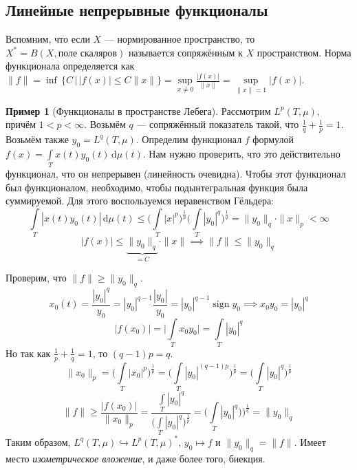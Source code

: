 \documentclass[11pt,openany,a4paper]{scrartcl}
\theoremstyle{plain}
\theoremstyle{definition}
\newtheorem{example}[theorem]{Пример}
\newcommand{\dif}{\, \mathrm d}
\DeclareMathOperator{\sign}{sign}
\begin{document}
\subsection{Линейные непрерывные функционалы}

Вспомним, что если $X$ — нормированное пространство, то
$X^\ast = B(X, \text{поле скаляров})$ называется сопряжённым к $X$ пространством.
Норма функционала определяется как $\|f\| = \inf\,\{C\,\big|\,|f(x)|
\leqslant C\|x\|\} =
\sup\limits_{x \neq 0}\frac{|f(x)|}{\|x\|} = \sup\limits_{\|x\|=1} |f(x)|$.

\begin{example}[Функционалы в пространстве Лебега]
        Рассмотрим $L^p(T, \mu)$, причём
        $1 < p < \infty$. Возьмём $q$ — сопряжённый показатель такой, что
        $\frac{1}{q} + \frac{1}{p} = 1$. Возьмём также $y_0 = L^q(T, \mu)$.
        Определим функционал $f$ формулой
        $f(x) = \int\limits_T x(t)y_0(t)\dif \mu(t)$. Нам нужно проверить, что
        это действительно функционал, что он непрерывен (линейность очевидна).
        Чтобы этот функционал был функционалом, необходимо, чтобы
        подынтегральная функция была суммируемой. Для этого воспользуемся
        неравенством Гёльдера:
        $$
        \int\limits_T |x(t)y_0(t)| \dif \mu(t) \leqslant
        \bigg(\int\limits_T |x|^p\bigg)^\frac{1}{p}
        \bigg(\int\limits_T |y_0|^q\bigg)^\frac{1}{q} = \|y_0\|_q\cdot \|x\|_p <
        \infty
        $$
        $$
        |f(x)| \leqslant \underbrace{\|y_0\|_q}_{=C} \cdot \|x\|
        \implies \|f\| \leqslant \|y_0\|_q
        $$
        
        Проверим, что $\|f\| \geqslant \|y_0\|_q$.
        $$
        x_0(t) = \frac{|y_0|^q}{y_0} = |y_0|^{q-1} \frac{|y_0|}{y_0} =
        |y_0|^{q-1}\sign y_0
        \implies x_0y_0 = |y_0|^q
        $$
        $$
        |f(x_0)| = \bigg|\int\limits_T x_0y_0\bigg| = \int\limits_T|y_0|^q
        $$
        Но так как $\frac{1}{p} + \frac{1}{q} = 1$, то $(q-1)p = q$.
        $$
        \|x_0\|_p = \bigg(\int\limits_T |x_0|^p\bigg)^\frac{1}{p} =
        \bigg(\int\limits_T |y_0|^{(q-1)p}\bigg)^\frac{1}{p} =
        \bigg(\int\limits_T |y_0|^q\bigg)^\frac{1}{p}
        $$
        $$
        \|f\|\geqslant \frac{|f(x_0)|}{\|x_0\|_p} =
        \frac{\int\limits_T |y_0|^q}{\bigg(\int\limits_T|y_0|^q\bigg)^\frac{1}{p}} =
        \bigg(\int\limits_T |y_0|^q)\bigg)^\frac{1}{q} = \|y_0\|_q
        $$
        Таким образом, $L^q(T, \mu) \hookrightarrow L^p(T, \mu)^\ast$,
        $y_0 \mapsto f$ и $\|y_0\|_q = \|f\|$. Имеет место
        \emph{изометрическое вложение}, и даже более того, биекция.
\end{example}
\end{document}
